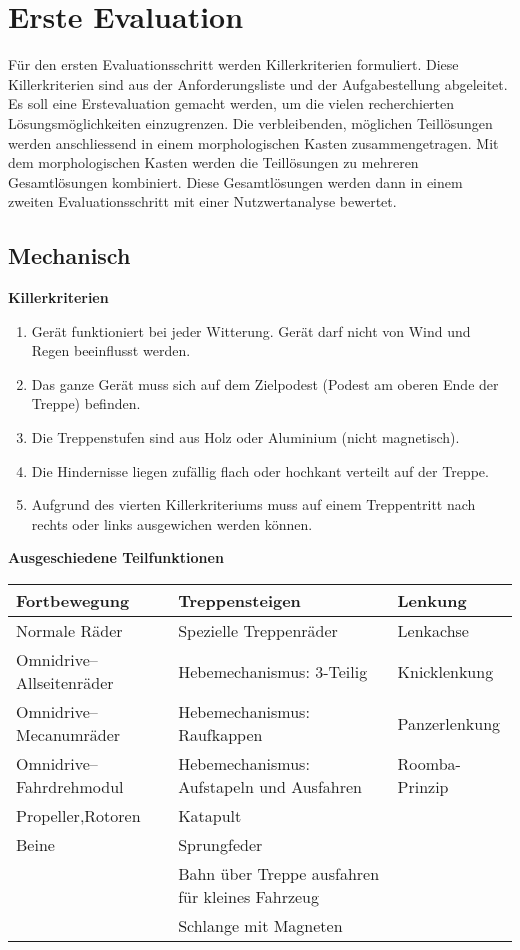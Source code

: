\section{Erste Evaluation}

Für den ersten Evaluationsschritt werden Killerkriterien formuliert. Diese Killerkriterien sind aus der Anforderungsliste und der Aufgabestellung abgeleitet. Es soll eine Erstevaluation gemacht werden, um die vielen recherchierten Lösungsmöglichkeiten einzugrenzen. Die verbleibenden, möglichen Teillösungen werden anschliessend in einem morphologischen Kasten zusammengetragen. Mit dem morphologischen Kasten werden die Teillösungen zu mehreren Gesamtlösungen kombiniert. Diese Gesamtlösungen werden dann in einem zweiten Evaluationsschritt mit einer Nutzwertanalyse bewertet.

\subsection{Mechanisch}
\textbf{Killerkriterien}
\begin{enumerate} 
	\item Gerät funktioniert bei jeder Witterung. Gerät darf nicht von Wind und Regen beeinflusst werden.
	\item Das ganze Gerät muss sich auf dem Zielpodest (Podest am oberen Ende der Treppe) befinden.
	\item Die Treppenstufen sind aus Holz oder Aluminium (nicht magnetisch).
	\item Die Hindernisse liegen zufällig flach oder hochkant verteilt auf der Treppe.
	\item Aufgrund des vierten Killerkriteriums muss auf einem Treppentritt nach rechts oder links ausgewichen werden können.
\end{enumerate}

\textbf{Ausgeschiedene Teilfunktionen}

\begin{longtable}[h]{l p{7cm} l}
\textbf{Fortbewegung} & \textbf{Treppensteigen} & \textbf{Lenkung} 
\tabularnewline
\endhead
Normale Räder & Spezielle Treppenräder & Lenkachse 
\tabularnewline
Omnidrive–Allseitenräder & Hebemechanismus: 3-Teilig & Knicklenkung 
\tabularnewline
Omnidrive–Mecanumräder & Hebemechanismus: Raufkappen & Panzerlenkung 
\tabularnewline
Omnidrive–Fahrdrehmodul & Hebemechanismus: Aufstapeln und Ausfahren & Roomba-Prinzip 
\tabularnewline
\cellcolor{red}Propeller,Rotoren & \cellcolor{red}Katapult & 
\tabularnewline
Beine & Sprungfeder &
\tabularnewline
 & \cellcolor{red}Bahn über Treppe ausfahren für kleines Fahrzeug & 
\tabularnewline
 & \cellcolor{red}Schlange mit Magneten & 
\end{longtable}

